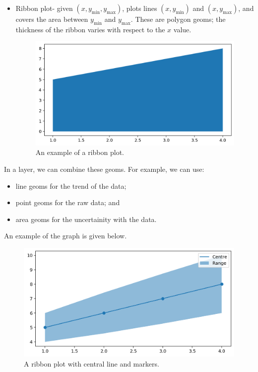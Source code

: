 \documentclass[a4paper, openany]{memoir}
\begin{document}
\begin{itemize}
    \item Ribbon plot- given $(x, y_{\min}, y_{\max})$, plots lines $(x, y_{\min})$ and $(x, y_{\max})$, and covers the area between $y_{\min}$ and $y_{\max}$. These are polygon geoms; the thickness of the ribbon varies with respect to the $x$ value.
    \begin{figure}[H]
        \centering
        \includegraphics[scale=0.4]{src/2.9 ribbon plot example.png}
        \caption{An example of a ribbon plot.}
    \end{figure}
\end{itemize}
In a layer, we can combine these geoms. For example, we can use:
\begin{itemize}
    \item line geoms for the trend of the data;
    \item point geoms for the raw data; and
    \item area geoms for the uncertainity with the data.
\end{itemize}
An example of the graph is given below.
\begin{figure}[H]
    \centering
    \includegraphics[scale=0.5]{src/2.10 ribbon plot with central line and markers.png}
    \caption{A ribbon plot with central line and markers.}
\end{figure}
\end{document}
